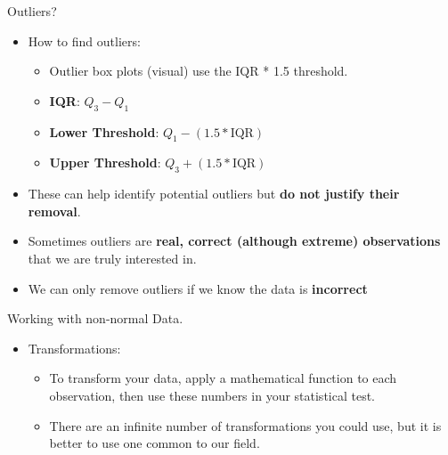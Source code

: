 \documentclass[
  ignorenonframetext,
]{beamer}
\providecommand{\tightlist}{%
  \setlength{\itemsep}{0pt}\setlength{\parskip}{0pt}}
\begin{document}
\begin{frame}{Outliers?}
\label{outliers}
\begin{itemize}
\tightlist
\item
  How to find outliers:

  \begin{itemize}
  \tightlist
  \item
    Outlier box plots (visual) use the IQR * 1.5 threshold.
  \item
    \textbf{IQR}: \(Q_3 - Q_1\)
  \item
    \textbf{Lower Threshold}: \(Q_1 - (1.5 * \text{IQR})\)
  \item
    \textbf{Upper Threshold}: \(Q_3 + (1.5 * \text{IQR})\)
  \end{itemize}
\end{itemize}

\begin{itemize}
\tightlist
\item
  These can help identify potential outliers but \textbf{do not justify
  their removal}.
\end{itemize}

\begin{itemize}
\tightlist
\item
  Sometimes outliers are \textbf{real, correct (although extreme)
  observations} that we are truly interested in.
\end{itemize}

\begin{itemize}
\tightlist
\item
  We can only remove outliers if we know the data is \textbf{incorrect}
\end{itemize}
\end{frame}

\begin{frame}{Working with non-normal Data.}
\label{working-with-non-normal-data.}
\begin{itemize}
\tightlist
\item
  Transformations:

  \begin{itemize}
  \item
    To transform your data, apply a mathematical function to each
    observation, then use these numbers in your statistical test.
  \item
    There are an infinite number of transformations you could use, but
    it is better to use one common to our field.
  \end{itemize}
\end{itemize}
\end{frame}
\end{document}
